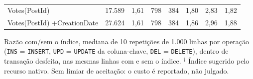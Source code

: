 {\begin{tabular}{lrrrrrrr}
Votes(PostId) & 17.589 & 1,61 & 798 & 384 & 1,80 & 2,83 & 1,82 \\
Votes(PostId) +CreationDate & 27.624 & 1,61 & 798 & 384 & 1,86 & 2,96 & 1,88 \\
\bottomrule
\end{tabular}\par
\vspace{3pt}
\begin{minipage}{\linewidth}\footnotesize
Razão com/sem o índice, mediana de 10 repetições de 1.000 linhas por operação (\texttt{INS} = \texttt{INSERT}, \texttt{UPD} = \texttt{UPDATE} da coluna-chave, \texttt{DEL} = \texttt{DELETE}), dentro de transação desfeita, nas mesmas linhas com e sem o índice. $^{\dagger}$ Índice sugerido pelo recurso nativo. Sem limiar de aceitação: o custo é reportado, não julgado.
\end{minipage}}
